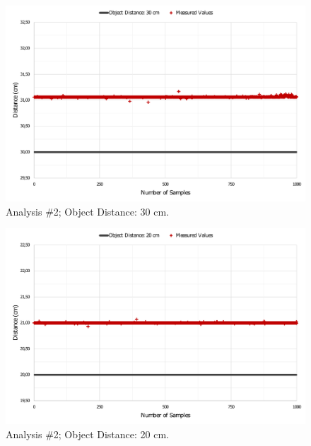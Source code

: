 \begin{figure}[h!]
    \centering
    \includegraphics[scale=0.52]{images/Results/testing_methodology/conf30.pdf}
    \caption{Analysis \#2; Object Distance: 30 cm.}
    \label{fig:conf30}
\end{figure}

\begin{figure}[h!]
    \centering
    \includegraphics[scale=0.52]{images/Results/testing_methodology/conf20.pdf}
    \caption{Analysis \#2; Object Distance: 20 cm.}
    \label{fig:conf20}
\end{figure}

